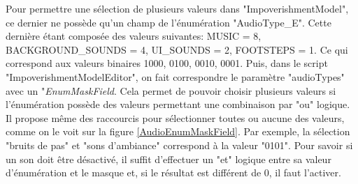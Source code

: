 		\begin{minipage}{\linewidth}
			\label{AudioImpoverishment}
		\end{minipage}\medskip%
		
		
		Pour permettre une sélection de plusieurs valeurs dans "ImpoverishmentModel", ce dernier ne possède qu'un champ de l'énumération "AudioType\_E". Cette dernière étant composée des valeurs suivantes: MUSIC = 8, BACKGROUND\_SOUNDS = 4, UI\_SOUNDS = 2, FOOTSTEPS = 1. Ce qui correspond aux valeurs binaires 1000, 0100, 0010, 0001. Puis, dans le script "ImpoverishmentModelEditor", on fait correspondre le paramètre "audioTypes" avec un "\textit{EnumMaskField}. Cela permet de pouvoir choisir plusieurs valeurs si l'énumération possède des valeurs permettant une combinaison par "ou" logique. Il propose même des raccourcis pour sélectionner toutes ou aucune des valeurs, comme on le voit sur la figure \ref{AudioEnumMaskField}. Par exemple, la sélection "bruits de pas" et "sons d'ambiance" correspond à la valeur "0101". Pour savoir si un son doit être désactivé, il suffit d'effectuer un "et" logique entre sa valeur d'énumération et le masque et, si le résultat est différent de 0, il faut l'activer.\medskip
		
